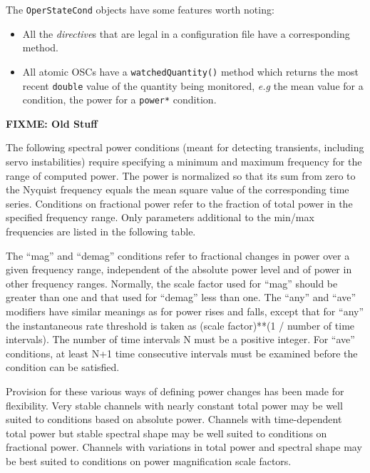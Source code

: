 {The \texttt{OperStateCond} objects have some features worth noting:

\begin{itemize}
\item All the \textit{directive}s that are legal in a configuration file have
   a corresponding method.
\item All atomic OSCs have a \texttt{watchedQuantity()} method which returns
   the most recent \texttt{double} value of the quantity being monitored,
   \textit{e.g} the mean value for a  condition, the
   power for a \texttt{power*} condition.
\end{itemize}


\begin{center}
  \textbf{{\large FIXME: Old Stuff}}
\end{center}



The following spectral power conditions (meant for detecting
transients, including servo instabilities) require specifying a
minimum and maximum frequency for the range of computed power. The
power is normalized so that its sum from zero to the Nyquist frequency
equals the mean square value of the corresponding time
series. Conditions on fractional power refer to the fraction of total
power in the specified frequency range.  Only parameters additional to
the min/max frequencies are listed in the following table.

The ``mag'' and ``demag'' conditions refer to fractional changes in
  power over a given frequency range, independent of the absolute power
level and of power in other frequency ranges. Normally, the scale
factor used for ``mag'' should be greater than one and that used for
``demag'' less than one. The ``any'' and ``ave'' modifiers have
similar meanings as for power rises and falls, except that for ``any''
the instantaneous rate threshold is taken as (scale factor)**(1 /
number of time intervals). The number of time intervals N must be a
positive integer. For ``ave'' conditions, at least N+1 time
consecutive intervals must be examined before the condition can be
satisfied.

Provision for these various ways of defining power changes has been
made for flexibility. Very stable channels with nearly constant total
power may be well suited to conditions based on absolute power.
Channels with time-dependent total power but stable spectral shape may
be well suited to conditions on fractional power. Channels with
variations in total power and spectral shape may be best suited to
conditions on power magnification scale factors.





}
